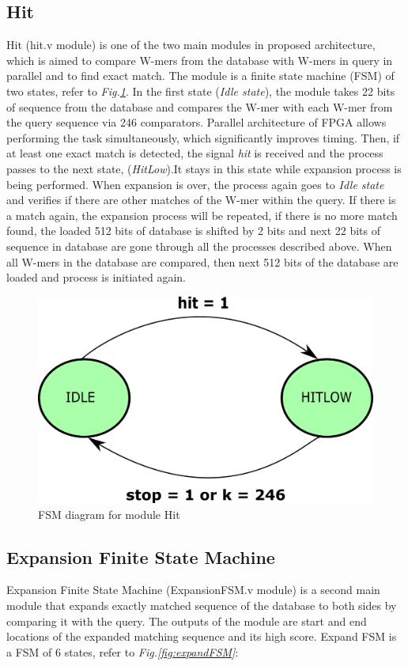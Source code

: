 \subsection{Hit}
\quad Hit (hit.v module) is one of the two main modules in proposed architecture, which is aimed to compare W-mers from the database with W-mers in query in parallel and to find exact match. The module is a finite state machine (FSM) of two states, refer to \textit{Fig.\ref{fig:hitFSM}}. In the first state (\textit{Idle state}), the module takes 22 bits of sequence from the database and compares the W-mer with each W-mer from the query sequence via 246 comparators. Parallel architecture of FPGA allows performing the task simultaneously, which significantly improves timing. Then, if at least one exact match is detected, the signal \textit{hit} is received and the process passes to the next state, (\textit{HitLow}).It stays in this state while expansion process is being performed. When expansion is over, the process again goes to \textit{Idle state} and verifies if there are other matches of the W-mer within the query. If there is a match again, the expansion process will be repeated, if there is no more match found, the loaded 512 bits of database is shifted by 2 bits and next 22 bits of sequence in database are gone through all the processes described above. When all W-mers in the database are compared, then next 512 bits of the database are loaded and process is initiated again. 

\begin{figure}[h!]
\centering
\includegraphics[width=0.7\columnwidth]{Figures/hitFSM.pdf}
\caption{FSM diagram for module Hit} \label{fig:hitFSM}
\end{figure}



\subsection{Expansion Finite State Machine}
\quad Expansion Finite State Machine (ExpansionFSM.v module) is a second main module that expands exactly matched sequence of the database to both sides by comparing it with the query. The outputs of the module are start and end locations of the expanded matching sequence and its high score. Expand FSM is a FSM of 6 states, refer to \textit{Fig.\ref{fig:expandFSM}}:

